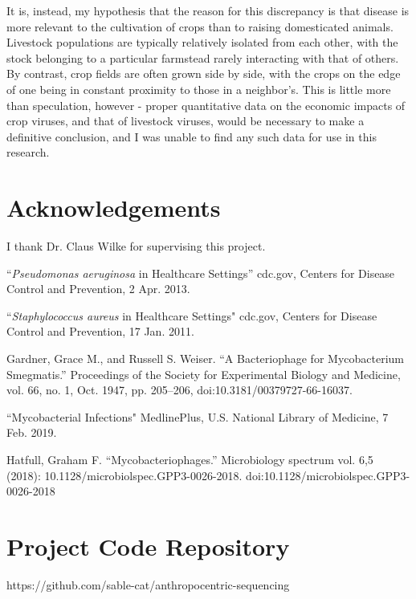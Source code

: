 \documentclass[12pt]{article}
\begin{document}
    It is, instead, my hypothesis that the reason for this discrepancy is that
    disease is more relevant to the cultivation of crops than to raising
    domesticated animals. Livestock populations are typically relatively
    isolated from each other, with the stock belonging to a particular
    farmstead rarely interacting with that of others. By contrast, crop fields
    are often grown side by side, with the crops on the edge of one being in
    constant proximity to those in a neighbor's. This is little more than
    speculation, however - proper quantitative data on the economic impacts of
    crop viruses, and that of livestock viruses, would be necessary to make
    a definitive conclusion, and I was unable to find any such data for use
    in this research.

    \section{Acknowledgements}

    I thank Dr. Claus Wilke for supervising this project.

    \begin{thebibliography}{}

        “\emph{Pseudomonas aeruginosa} in Healthcare Settings” cdc.gov, Centers for Disease Control and Prevention, 2 Apr. 2013.
        
        “\emph{Staphylococcus aureus} in Healthcare Settings" cdc.gov, Centers for Disease Control and Prevention, 17 Jan. 2011.

        Gardner, Grace M., and Russell S. Weiser. “A Bacteriophage for Mycobacterium Smegmatis.” Proceedings of the Society for Experimental Biology and Medicine, vol. 66, no. 1, Oct. 1947, pp. 205–206, doi:10.3181/00379727-66-16037.
        
        “Mycobacterial Infections" MedlinePlus, U.S. National Library of Medicine, 7 Feb. 2019.

        Hatfull, Graham F. “Mycobacteriophages.” Microbiology spectrum vol. 6,5 (2018): 10.1128/microbiolspec.GPP3-0026-2018. doi:10.1128/microbiolspec.GPP3-0026-2018

    \end{thebibliography}

    \appendix

    \section{Project Code Repository}
    https://github.com/sable-cat/anthropocentric-sequencing
\end{document}
